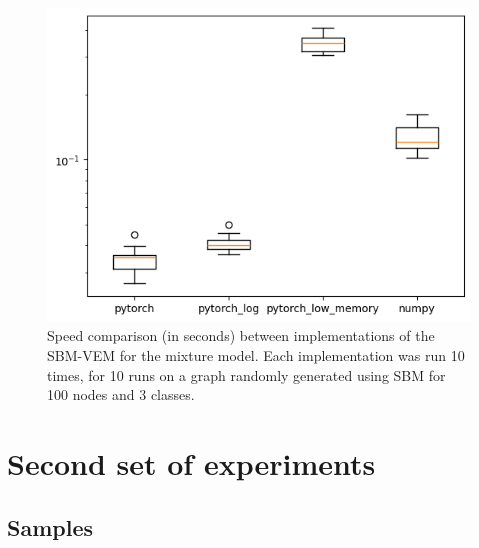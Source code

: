 \documentclass[switch, 12pt]{article}
\begin{document}
\begin{figure}[h]
    \centering
    \includegraphics[width=0.5\linewidth]{figures/speed_comparison_VEM.png}
    \caption{Speed comparison (in seconds) between implementations of the SBM-VEM for the mixture model. Each implementation was run 10 times, for 10 runs on a graph randomly generated using SBM for 100 nodes and 3 classes.}
    \label{fig:speed_comparison}
\end{figure}

\newpage

\section{Second set of experiments}
\label{app:sbm}

\subsection{Samples}

\hphantom{.}  %
\end{document}
